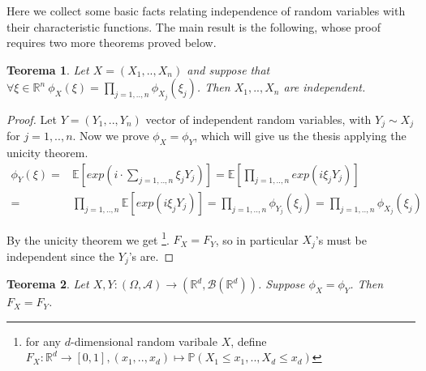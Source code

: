 \documentclass[11pt,a4paper]{article}
\newtheorem{theorem}{Teorema}
\theoremstyle{definition}
\theoremstyle{remark}
\begin{document}
Here we collect some basic facts relating independence of random variables with their characteristic functions. 
The main result is the following, whose proof requires two more theorems proved below.

\begin{theorem}

	Let $X = (X_1,..,X_n)$ and suppose that $\forall \xi \in \mathbb{R}^n \ \phi_X(\xi) = \prod_{j=1,..,n} \phi_{X_j}(\xi_j)$.
	Then $X_1,..,X_n$ are independent.

\end{theorem}

\begin{proof}

	Let $Y = (Y_1,..,Y_n)$ vector of independent random variables, with $Y_j \sim X_j$ for $j = 1,..,n$.
	Now we prove $\phi_X = \phi_Y$, which will give us the thesis applying the unicity theorem.
	\begin{align*}
		\phi_Y(\xi) =& \mathbb{E}[exp(i \cdot \sum_{j=1,..,n} \xi_j Y_j)] = \mathbb{E}[\prod_{j=1,..,n} exp(i \xi_j Y_j)] \\
			=& \prod_{j=1,..,n} \mathbb{E}[exp(i \xi_j Y_j)] = \prod_{j=1,..,n} \phi_{Y_j}(\xi_j) = \prod_{j=1,..,n} \phi_{X_j}(\xi_j)
	\end{align*}

	By the unicity theorem we get \footnote{for any $d$-dimensional random varibale $X$, define 
	$F_X: \mathbb{R}^d \to [0,1], (x_1,..,x_d) \mapsto \mathbb{P}(X_1 \leq x_1,..,X_d \leq x_d)$}. 
	$F_X = F_Y$, so in particular $X_j$'s must be independent since the $Y_j$'s are.

\end{proof}


\begin{theorem}

	Let $X,Y: (\Omega, \mathcal{A}) \to (\mathbb{R}^d, \mathcal{B}(\mathbb{R}^d))$. Suppose $\phi_X = \phi_Y$.
	Then $F_X = F_Y$.

\end{theorem}
\end{document}
